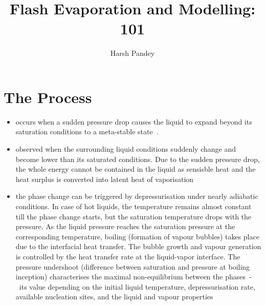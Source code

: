 \documentclass[11pt]{article}
\begin{document}
\title{Flash Evaporation and Modelling: 101} %
\author{Harsh Pandey} %
\maketitle

\section{The Process}
\begin{itemize}
\item occurs when a sudden pressure drop causes the liquid to expand beyond its saturation conditions to a meta-stable state~\cite{Gartner2024-zh}.
\item observed when the surrounding liquid conditions suddenly change and become lower than its saturated conditions. Due to the sudden pressure drop, the whole energy cannot be contained in the liquid as sensisble heat and the heat surplus is converted into latent heat of vaporisation~\cite{sauryFlashEvaporationWater2005}
\item the phase change can be triggered by depressurisation under nearly adiabatic conditions. In case of hot liquids, the temperature remains almost constant till the phase change starts, but the saturation temperature drops with the pressure. As the liquid pressure reaches the saturation pressure at the corresponding temperature, boiling (formation of vapour bubbles) takes place due to the interfacial heat transfer. The bubble growth and vapour generation is controlled by the heat transfer rate at the liquid-vapor interface. The pressure undershoot (difference between saturation and pressure at boiling inception) characterises the maximal non-equilibrium between the phases~-~its value depending on the initial liquid temperature, depressurisation rate, available nucleation sites, and the liquid and vapour properties~\cite{liaoReviewNumericalModelling2021}
\end{itemize}
\end{document}
